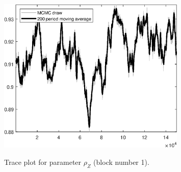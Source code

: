 \begin{figure}[H]
\centering
  \includegraphics[width=0.8\textwidth]{BRS_imp_mobility/graphs/TracePlot_rho_Z_blck_1}\\
    \caption{Trace plot for parameter ${\rho_Z}$ (block number 1).}
\end{figure}
